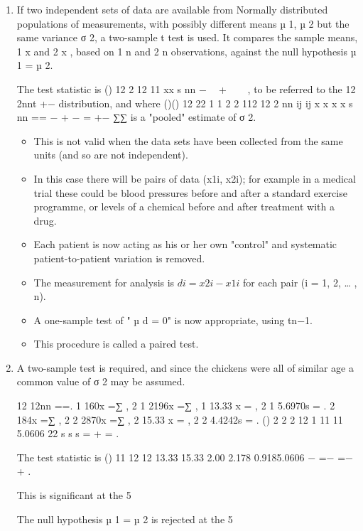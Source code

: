 \documentclass[a4paper,12pt]{article}
\begin{document}
\begin{enumerate} 
\item If two independent sets of data are available from Normally distributed populations of measurements, with possibly different means µ 1, µ 2 but the same variance σ
 2, a two-sample t test is used.  It compares the sample means, 1 x and 2 x , based on 1 n and 2 n observations, against the null hypothesis µ 1 = µ 2. 
 
The test statistic is 
 () 12
2
12 11 xx
s
nn
−  +   ,  to be referred to the 12 2nnt +− distribution, and where 
 ()() 12 22 1 1 2 2 112
12 2
nn
ij ij x x x x
s
nn == − + −
=
+− ∑∑  is a "pooled" estimate of σ
 2. 
 \begin{itemize}
     \item  This is not valid when the data sets have been collected from the same units (and so are not independent). 
     \item In this case there will be pairs of data (x1i, x2i);  for example in a medical trial these could be blood pressures before and after a standard exercise programme, or levels of a chemical before and after treatment with a drug. 
     \item Each patient is now acting as his or her own "control" and systematic patient-to-patient variation is removed. 
     \item The measurement for analysis is $di = x2i − x1i$ for each pair (i = 1, 2, … , n).  \item A one-sample test of " µ d = 0" is now appropriate, using tn−1.  
     
     \item This procedure is called a paired test. 
 \end{itemize}

 
\item  A two-sample test is required, and since the chickens were all of similar age a common value of σ 2 may be assumed. 
 
12 12nn ==. 
 1 160x =∑ ,   2 1 2196x =∑ ,   1 13.33 x = ,   2 1 5.6970s = . 
 2 184x =∑ ,   2 2 2870x =∑ ,   2 15.33 x = ,   2 2 4.4242s = . 
 () 2 2 2 12 1 11 11 5.0606 22 s s s = + = . 
 
The test statistic is 
() 11 12 12 13.33 15.33 2.00 2.178 0.9185.0606 − =− =− +
. 
 
This is significant at the 5%
 
The null hypothesis µ 1 = µ 2 is rejected at the 5%

\end{enumerate}
\end{document}

